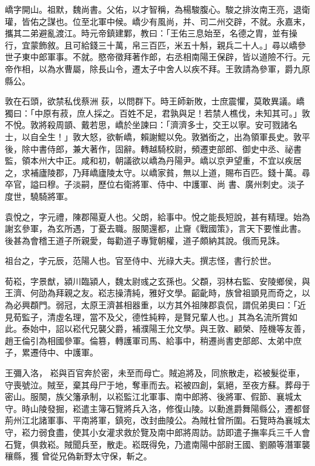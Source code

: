 \begin{pinyinscope}
 嶠字開山。祖默，魏尚書。父佑，以才智稱，為楊駿腹心。駿之排汝南王亮，退衛瓘，皆佑之謀也。位至北軍中候。嶠少有風尚，并、司二州交辟，不就。永嘉末，攜其二弟避亂渡江。時元帝鎮建鄴，教曰：「王佑三息始至，名德之胄，並有操行，宜蒙飾敘。且可給錢三十萬，帛三百匹，米五十斛，親兵二十人。」尋以嶠參世子東中郎軍事。不就。愍帝徵拜著作郎，右丞相南陽王保辟，皆以道險不行。元帝作相，以為水曹屬，除長山令，遷太子中舍人以疾不拜。王敦請為參軍，爵九原縣公。



 敦在石頭，欲禁私伐蔡洲
 荻，以問群下。時王師新敗，士庶震懼，莫敢異議。嶠獨曰：「中原有菽，庶人採之。百姓不足，君孰與足！若禁人樵伐，未知其可。」敦不悅。敦將殺周顗、戴若思，嶠於坐諫曰：「濟濟多士，交王以寧。安可戮諸名士，以自全生！」敦大怒，欲斬嶠，賴謝鯤以免。敦猶銜之，出為領軍長史。敦平後，除中書侍郎，兼大著作，固辭。轉越騎校尉，頻遷吏部郎、御史中丞、祕書監，領本州大中正。咸和初，朝議欲以嶠為丹陽尹。嶠以京尹望重，不宜以疾居之，求補廬陵郡，乃拜嶠廬陵太守。以嶠家貧，無以上道，賜布百匹。錢十萬。尋卒官，謚曰穆。子淡嗣，歷位右衛將軍、侍中、中護軍、尚
 書、廣州刺史。淡子度世，驍騎將軍。



 袁悅之，字元禮，陳郡陽夏人也。父朗，給事中。悅之能長短說，甚有精理。始為謝玄參軍，為玄所遇，丁憂去職。服闋還都，止齎《戰國策》，言天下要惟此書。後甚為會稽王道子所親愛，每勸道子專覽朝權，道子頗納其說。俄而見誅。



 祖台之，字元辰，范陽人也。官至侍中、光祿大夫。撰志怪，書行於世。



 荀崧，字景猷，潁川臨潁人，魏太尉彧之玄孫也。父頵，羽林右監、安陵鄉侯，與王濟、何劭為拜親之友。崧志操清純，雅好文學。齠齔時，族曾祖顗見而奇之，以為必興頵門。弱冠，太原王濟甚相器重，以方其外祖陳郡袁侃，謂侃弟奧曰：「近見荀監子，清虛名理，當不及父，德性純粹，是賢兄輩人也。」其為名流所賞如此。泰始中，詔以崧代兄襲父爵，補濮陽王允文學。與王敦、顧榮、陸機等友善，趙王倫引為相國參軍。倫篡，轉護軍司馬、給事中，稍遷尚書吏部郎、太弟中庶子，累遷侍中、中護軍。



 王彌入洛，
 崧與百官奔於密，未至而母亡。賊追將及，同旅散走，崧被髮從車，守喪號泣。賊至，棄其母尸于地，奪車而去。崧被四創，氣絕，至夜方蘇。葬母于密山。服闋，族父籓承制，以崧監江北軍事、南中郎將、後將軍、假節、襄城太守。時山陵發掘，崧遣主簿石覽將兵入洛，修復山陵。以勳進爵舞陽縣公，遷都督荊州江北諸軍事、平南將軍，鎮宛，改封曲陵公。為賊杜曾所圍。石覽時為襄城太守，崧力弱食盡，使其小女灌求救於覽及南中郎將周訪。訪即遣子撫率兵三千人會石覽，俱救崧。賊聞兵至，散走。崧既得免，乃遣南陽中部尉王國、劉願等潛軍襲穰縣，獲
 曾從兄偽新野太守保，斬之。




\end{pinyinscope}
